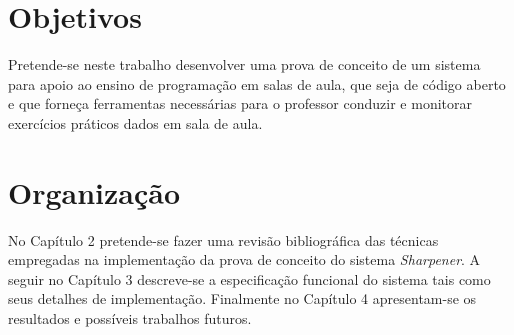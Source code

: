\section{Objetivos}
Pretende-se neste trabalho desenvolver uma prova de conceito de um sistema para apoio 
ao ensino de programação em salas de aula, que seja de código aberto e que forneça 
ferramentas necessárias para o professor conduzir e monitorar exercícios práticos dados 
em sala de aula.

\section{Organização}
No Capítulo 2 pretende-se fazer uma revisão bibliográfica das técnicas empregadas na implementação 
da prova de conceito do sistema \emph{Sharpener}. A seguir no Capítulo 3 descreve-se a especificação 
funcional do sistema tais como seus detalhes de implementação. Finalmente no Capítulo 4 apresentam-se 
os resultados e possíveis trabalhos futuros.

